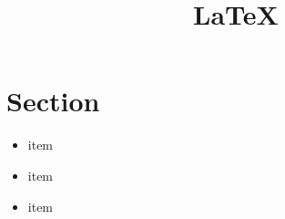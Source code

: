\documentclass{article} \title{\LaTeX}
\begin{document}
\maketitle 
\section{Section} \begin{itemize}

\item{item} 
\item{item} 
\item{item} 

\end{itemize} 
\end{document}
